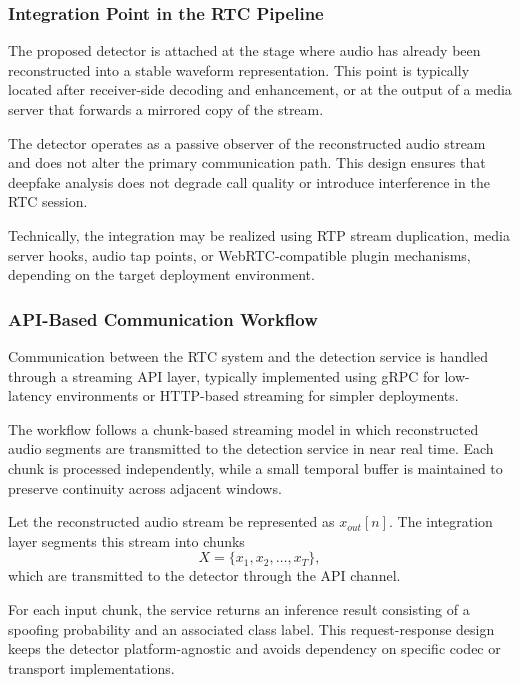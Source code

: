 \subsubsection{Integration Point in the RTC Pipeline}

The proposed detector is attached at the stage where audio has already been reconstructed into a stable waveform representation. This point is typically located after receiver-side decoding and enhancement, or at the output of a media server that forwards a mirrored copy of the stream.

The detector operates as a passive observer of the reconstructed audio stream and does not alter the primary communication path. This design ensures that deepfake analysis does not degrade call quality or introduce interference in the RTC session.

Technically, the integration may be realized using RTP stream duplication, media server hooks, audio tap points, or WebRTC-compatible plugin mechanisms, depending on the target deployment environment.

\subsubsection{API-Based Communication Workflow}

Communication between the RTC system and the detection service is handled through a streaming API layer, typically implemented using gRPC for low-latency environments or HTTP-based streaming for simpler deployments.

The workflow follows a chunk-based streaming model in which reconstructed audio segments are transmitted to the detection service in near real time. Each chunk is processed independently, while a small temporal buffer is maintained to preserve continuity across adjacent windows.

Let the reconstructed audio stream be represented as \(x_{out}[n]\). The integration layer segments this stream into chunks
\begin{equation}
X = \{x_1, x_2, \ldots, x_T\},
\end{equation}
which are transmitted to the detector through the API channel.

For each input chunk, the service returns an inference result consisting of a spoofing probability and an associated class label. This request-response design keeps the detector platform-agnostic and avoids dependency on specific codec or transport implementations.

